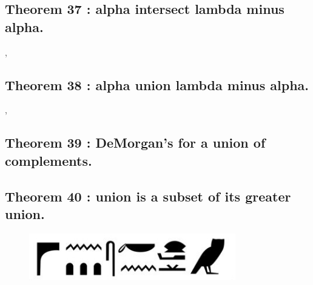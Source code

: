 \documentclass[preview]{standalone}
\begin{document}
\subsection[Alpha intersect lambda minus alpha is empty.]
    {
        \color{section}Theorem 37 \color{black} : alpha intersect lambda minus alpha.
    }

\sep
\pagebreak


\subsection[Alpha union lambda minus alpha.]
    {
        \color{section}Theorem 38 \color{black} : alpha union lambda minus alpha.
    }

\sep


\subsection[DeMorgan's law for a union of complements.]
    {
        \color{section}Theorem 39 \color{black} : DeMorgan's for a union of complements.
    }

\pagebreak


\subsection[Union is a subset of its greater union.]
    {
        \color{section}Theorem 40 \color{black} : union is a subset of its greater union.
    }

\vspace{2.5\baselineskip}
\begin{figure}[!h]
    \centering
    \includegraphics[width=9cm]{../resources/jpg/2.2.set.operations/border6.jpg}
\end{figure}
\vspace{2\baselineskip}
\end{document}
